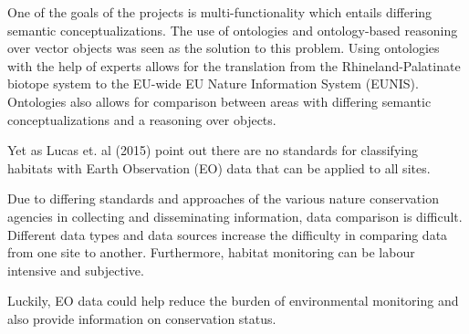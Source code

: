 One of the goals of the projects is
multi-functionality which entails differing semantic conceptualizations. The use
of ontologies and ontology-based reasoning over vector objects was seen as the
solution to this problem. Using ontologies with the help of experts allows for
the translation from the Rhineland-Palatinate biotope system to the EU-wide EU
Nature Information System (EUNIS). Ontologies also allows
for comparison between areas with differing semantic conceptualizations and a
reasoning over objects. 

Yet as Lucas et. al (2015) point out there are no standards for classifying
habitats with Earth Observation (EO) data that can be applied to all sites. 

Due to differing standards and approaches of the various nature conservation
agencies in collecting and disseminating information, data comparison is
difficult. Different data types and data sources increase the difficulty in
comparing data from one site to another. Furthermore, habitat monitoring can
be labour intensive and subjective.

Luckily, EO data could help reduce the burden of environmental monitoring and
also provide information on conservation status.
